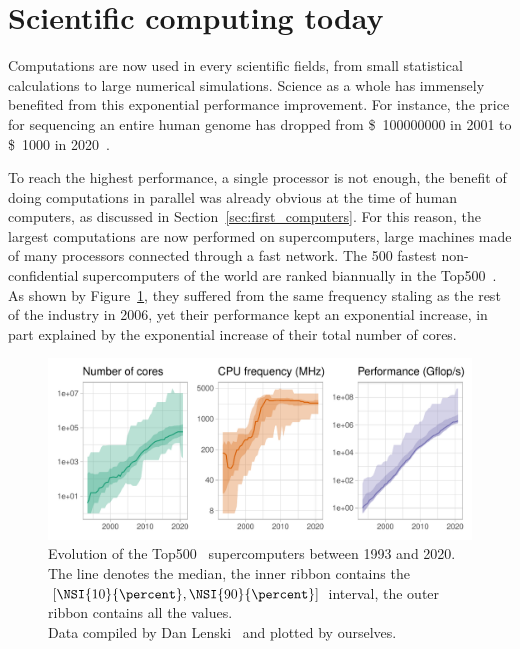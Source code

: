     \section{Scientific computing today}%
    \label{sec:scientific_computing_today}

        Computations are now used in every scientific fields, from small statistical calculations to large numerical
        simulations. Science as a whole has immensely benefited from this exponential performance improvement. For
        instance, the price for sequencing an entire human genome has dropped from \SI{100000000}[\$]{} in 2001 to
        \SI{1000}[\$]{} in 2020~\cite{genome_sequencing}.

        To reach the highest performance, a single processor is not enough, the benefit of doing computations in
        parallel was already obvious at the time of human computers, as discussed in Section~\ref{sec:first_computers}.
        For this reason, the largest computations are now performed on supercomputers, large machines made of many
        processors connected through a fast network. The 500 fastest non-confidential supercomputers of the world are
        ranked biannually in the Top500~\cite{top500}. As shown by Figure~\ref{fig:context:top500}, they suffered from
        the same frequency staling as the rest of the industry in 2006, yet their performance kept an exponential
        increase, in part explained by the exponential increase of their total number of cores.

        \begin{figure}[htbp]
            \centering
            \includegraphics[width=\textwidth]{img/context/top500.pdf}
            \caption{\label{fig:context:top500}
            Evolution of the Top500~\cite{top500} supercomputers between 1993 and 2020.  The line denotes the median, the inner ribbon
            contains the \([\NSI{10}{\percent}, \NSI{90}{\percent}]\) interval, the outer ribbon contains all the
            values.\\ Data compiled by Dan Lenski~\cite{top500_compiled} and plotted by ourselves.}
        \end{figure}

